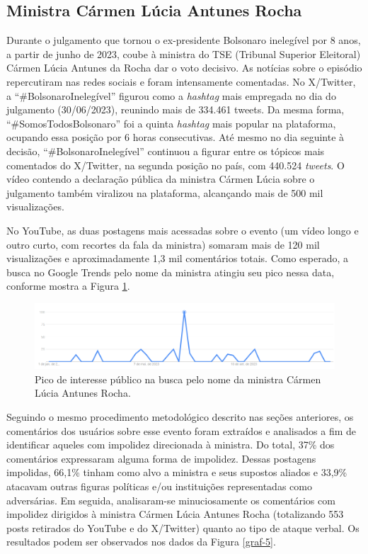 \documentclass[portuguese]{textolivre}
\begin{document}
\subsection{Ministra Cármen Lúcia Antunes Rocha}
Durante o julgamento que tornou o ex-presidente Bolsonaro inelegível por 8 anos, a partir de junho de 2023, coube à ministra do TSE (Tribunal Superior Eleitoral) Cármen Lúcia Antunes da Rocha dar o voto decisivo. As notícias sobre o episódio repercutiram nas redes sociais e foram intensamente comentadas. No X/Twitter, a ``\#BolsonaroInelegível'' figurou como a \textit{hashtag} mais empregada no dia do julgamento (30/06/2023), reunindo mais de 334.461 tweets. Da mesma forma, ``\#SomosTodosBolsonaro'' foi a quinta \textit{hashtag} mais popular na plataforma, ocupando essa posição por 6 horas consecutivas. Até mesmo no dia seguinte à decisão, ``\#BolsonaroInelegível'' continuou a figurar entre os tópicos mais comentados do X/Twitter, na segunda posição no país, com 440.524 \textit{tweets}. O vídeo contendo a declaração pública da ministra Cármen Lúcia sobre o julgamento também viralizou na plataforma, alcançando mais de 500 mil visualizações.

No YouTube, as duas postagens mais acessadas sobre o evento (um vídeo longo e outro curto, com recortes da fala da ministra) somaram mais de 120 mil visualizações e aproximadamente 1,3 mil comentários totais. Como esperado, a busca no Google Trends pelo nome da ministra atingiu seu pico nessa data, conforme mostra a Figura \ref{graf-4}.

\begin{figure}[h!]
\centering
\begin{minipage}{.90\textwidth}
\includegraphics[width =\textwidth]{Fig6.png}
\caption{Pico de interesse público na busca pelo nome da ministra Cármen Lúcia Antunes Rocha.}
\label{graf-4}
\end{minipage}
\end{figure}

Seguindo o mesmo procedimento metodológico descrito nas seções anteriores, os comentários dos usuários sobre esse evento foram extraídos e analisados a fim de identificar aqueles com impolidez direcionada à ministra. Do total, 37\% dos comentários expressaram alguma forma de impolidez. Dessas postagens impolidas, 66,1\% tinham como alvo a ministra e seus supostos aliados e 33,9\% atacavam outras figuras políticas e/ou instituições representadas como adversárias. Em seguida, analisaram-se minuciosamente os comentários com impolidez dirigidos à ministra Cármen Lúcia Antunes Rocha (totalizando 553 posts retirados do YouTube e do X/Twitter) quanto ao tipo de ataque verbal. Os resultados podem ser observados nos dados da Figura \ref{graf-5}.
\end{document}
